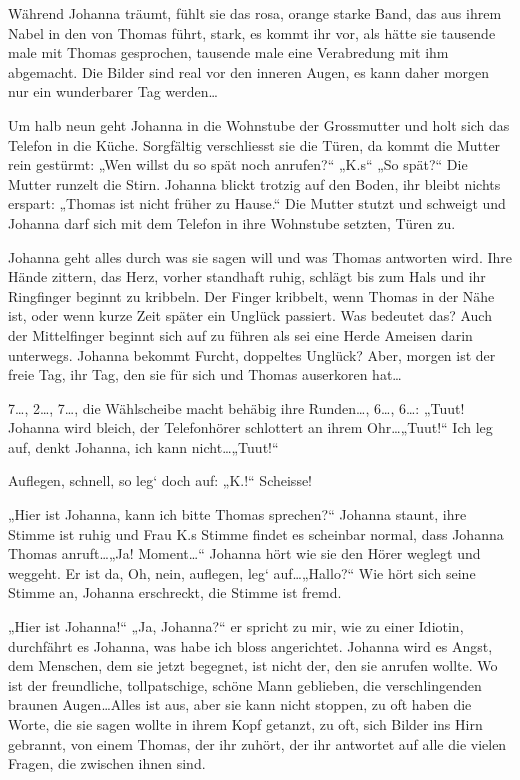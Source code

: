 \documentclass[10pt,a5paper]{book}
\begin{document}
Während Johanna träumt, fühlt sie das rosa, orange starke Band, das aus ihrem Nabel in den von Thomas führt, stark, es kommt ihr vor, als hätte sie tausende male mit Thomas gesprochen, tausende male eine Verabredung mit ihm abgemacht. Die Bilder sind real vor den inneren Augen, es kann daher morgen nur ein wunderbarer Tag werden\dots 

Um halb neun geht Johanna in die Wohnstube der Grossmutter und holt sich das Telefon in die Küche. Sorgfältig verschliesst sie die Türen, da kommt die Mutter rein gestürmt: „Wen willst du so spät noch anrufen?“ „K.s“ „So spät?“ Die Mutter runzelt die Stirn. Johanna blickt trotzig auf den Boden, ihr bleibt nichts erspart: „Thomas ist nicht früher zu Hause.“ Die Mutter stutzt und schweigt und Johanna darf sich mit dem Telefon in ihre Wohnstube setzten, Türen zu.

Johanna geht alles durch was sie sagen will und was Thomas antworten wird. Ihre Hände zittern, das Herz, vorher standhaft ruhig, schlägt bis zum Hals und ihr Ringfinger beginnt zu kribbeln. Der Finger kribbelt, wenn Thomas in der Nähe ist, oder wenn kurze Zeit später ein Unglück passiert. Was bedeutet das? Auch der Mittelfinger beginnt sich auf zu führen  als sei eine Herde Ameisen darin unterwegs. Johanna bekommt Furcht, doppeltes Unglück? Aber, morgen ist der freie Tag, ihr Tag, den sie für sich und Thomas auserkoren hat\dots 

7\dots , 2\dots , 7\dots, die Wählscheibe macht behäbig ihre Runden\dots , 6\dots, 6\dots : „Tuut! Johanna wird bleich, der Telefonhörer schlottert an ihrem Ohr\dots  „Tuut!“ Ich leg auf, denkt Johanna, ich kann nicht\dots  „Tuut!“

Auflegen, schnell, so leg` doch auf: „K.!“ Scheisse!

„Hier ist Johanna, kann ich bitte Thomas sprechen?“ Johanna staunt, ihre Stimme ist ruhig und Frau K.s Stimme findet es scheinbar normal, dass Johanna Thomas anruft\dots  „Ja! Moment\dots “ Johanna hört wie sie den Hörer weglegt und weggeht. Er ist da, Oh, nein, auflegen, leg` auf\dots  „Hallo?“ Wie hört sich seine Stimme an, Johanna erschreckt, die Stimme ist fremd.

„Hier ist Johanna!“ „Ja, Johanna?“ er spricht zu mir, wie zu einer Idiotin, durchfährt es Johanna, was habe ich bloss angerichtet. Johanna wird es Angst, dem Menschen, dem sie jetzt begegnet, ist nicht der, den sie anrufen wollte. Wo ist der freundliche, tollpatschige, schöne Mann geblieben, die verschlingenden braunen Augen\dots  Alles ist aus, aber sie kann nicht stoppen, zu oft haben die Worte, die sie sagen wollte in ihrem Kopf getanzt, zu oft, sich Bilder ins Hirn gebrannt, von einem Thomas, der ihr zuhört, der ihr antwortet auf alle die vielen Fragen, die zwischen ihnen sind.
\end{document}
